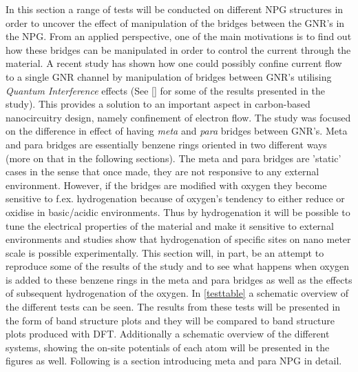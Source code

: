 In this section a range of tests will be conducted on different NPG structures in order to uncover the effect of manipulation of the bridges between the GNR's in the NPG. From an applied perspective, one of the main motivations is to find out how these bridges can be manipulated in order to control the current through the material. A recent study has shown how one could possibly confine current flow to a single GNR channel by manipulation of bridges between GNR's utilising \textit{Quantum Interference} effects (See \cref{} for some of the results presented in the study). This provides a solution to an important aspect in carbon-based nanocircuitry design, namely confinement of electron flow. The study was focused on the difference in effect of having \textit{meta} and \textit{para} bridges between GNR's. Meta and para bridges are essentially benzene rings oriented in two different ways (more on that in the following sections). The meta and para bridges are 'static' cases in the sense that once made, they are not responsive to any external environment. However, if the bridges are modified with oxygen they become sensitive to f.ex. hydrogenation because of oxygen's tendency to either reduce or oxidise in basic/acidic environments. Thus by hydrogenation it will be possible to tune the electrical properties of the material and make it sensitive to external environments and studies show that hydrogenation of specific sites on nano meter scale is possible experimentally. This section will, in part, be an attempt to reproduce some of the results of the study and to see what happens when oxygen is added to these benzene rings in the meta and para bridges as well as the effects of subsequent hydrogenation of the oxygen.  In \cref{testtable} a schematic overview of the different tests can be seen. The results from these tests will be presented in the form of band structure plots and they will be compared to band structure plots produced with DFT. Additionally a schematic overview of the different systems, showing the on-site potentials of each atom will be presented in the figures as well. Following is a section introducing meta and para NPG in detail. 
